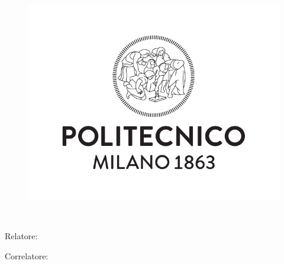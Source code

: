 \begin{titlepage}
    \begin{center}
    	\Large
        \spacedlowsmallcaps{\myUni} \\
        \large
        \bigskip\myFaculty \\
        \medskip\mySchool \\
    	\medskip\myDepartment \\
    	\bigskip\myCourseFirstPartIT \\
        \medskip\myCourseSecondPartIT \\  

        \hfill

        \vfill
        
        \begin{figure}[!h]
			\begin{center}
				\includegraphics[width=0.3\columnwidth]{Images/logoPoli.pdf}
			\end{center}
		\end{figure}
		
		\vfill

        \begingroup
       		\LARGE	
            \myTitleIT \\ \bigskip
        \endgroup

        \vfill

		\flushleft 
		\normalsize{Relatore:}
		\medskip\spacedlowsmallcaps{\mySupervisor}

		\normalsize{Correlatore:}
		\medskip\spacedlowsmallcaps{\myOtherSupervisor}\\
        

\end{center}
\end{titlepage}
